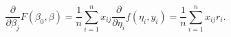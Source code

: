 \[
  \frac{\partial}{\partial \beta_j} F( \beta_0, \beta ) = \frac{1}{n} \sum_{i = 1}^n x_{ij} \frac{\partial}{\partial \eta_i} f( \eta_i, y_i)
                                                        = \frac{1}{n} \sum_{i = 1}^n x_{ij} r_i.
\]
